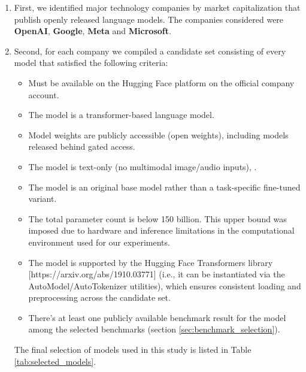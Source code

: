 \begin{enumerate}
    \item First, we identified major technology companies by market capitalization that publish openly released language models. The companies considered were \textbf{OpenAI}, \textbf{Google}, \textbf{Meta} and \textbf{Microsoft}.
    \item Second, for each company we compiled a candidate set consisting of every model that satisfied the following criteria:
    
        \begin{itemize}
            \item Must be available on the Hugging Face platform on the official company account.
            \item The model is a transformer-based language model.
            \item Model weights are publicly accessible (open weights), including models released behind
            gated access.
            \item The model is text-only (no multimodal image/audio inputs), .
            \item The model is an original base model rather than a task-specific fine-tuned variant.
            \item The total parameter count is below 150 billion. This upper bound was imposed due to
            hardware and inference limitations in the computational environment used for our experiments.
            \item The model is supported by the Hugging Face Transformers library [https://arxiv.org/abs/1910.03771] (i.e., it can be
            instantiated via the AutoModel/AutoTokenizer utilities), which ensures consistent loading and
            preprocessing across the candidate set.
            \item There's at least one publicly available benchmark result for the model among the selected benchmarks (section \ref{sec:benchmark_selection}).
        \end{itemize}

        The final selection of models used in this study is listed in Table \ref{tab:selected_models}.


\end{enumerate}
